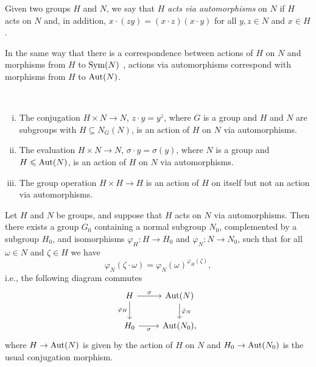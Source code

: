 \begin{defn}
    Given two groups\/ $H$ and\/ $N$, we say that\/ $H$ \textsl{acts via automorphisms} on\/ $N$ if\/ $H$ acts on\/ $N$ and, in addition, $x\cdot(zy) = (x\cdot z)(x\cdot y)$ for all\/ $y,z\in N$ and\/ $x\in H$.
\end{defn}

\begin{rem}\label{actions-and-automorphisms}
    In the same way that there is a correspondence between actions of\/ $H$ on\/ $N$ and morphisms from\/ $H$ to\/ ${\rm Sym}(N)$ {}, actions via automorphisms correspond with morphisms from\/ $H$ to\/ ${\rm Aut}(N)$. 
\end{rem}

\begin{xmpls}\label{examples-action-via-automorphisms}${}$
    \begin{enumerate}[i),font=\upshape]
        \item The conjugation\/ $H\times N\to N$, $z\cdot y=y^z$, where\/ $G$ is a group and\/ $H$ and\/ $N$ are subgroups with\/ $H\subseteq N_G(N)$, is an action of\/ $H$ on\/ $N$ via automorphisms.

        \item The evaluation\/ $H\times N\to N$, $\sigma\cdot y=\sigma(y)$, where\/ $N$ is a group and\/ $H\leqslant{\rm Aut}(N)$, is an action of\/ $H$ on\/ $N$ via automorphisms.

        \item The group operation $H\times H\to H$ is an action of\/ $H$ on itself but not an action via automorphisms.
    \end{enumerate}
\end{xmpls}

\begin{thm}\label{semidirect-product-thm}
    Let\/ $H$ and\/ $N$ be groups, and suppose that\/ $H$ acts on\/ $N$ via automorphisms. Then there exists a group\/ $G_0$ containing a normal subgroup\/ $N_0$, complemented by a subgroup\/ $H_0$, and isomorphisms $\varphi_H\colon H\to H_0$ and $\varphi_N\colon N\to N_0$, such that for all\/ $\omega \in N$ and\/ $\zeta \in H$ we have
    \begin{equation}\label{eq7}
        \varphi_N(\zeta\cdot\omega) = \varphi_N(\omega)^{\varphi_H(\zeta)},
    \end{equation}
    i.e., the following diagram commutes
    $$
        \begin{tikzcd}
            H \arrow[r, "\sigma"] \arrow[d, "\varphi_H"']
                & \Aut(N) \arrow[d, "\hat{\varphi}_N"] \\
            H_0 \arrow[r, "\sigma"']
                & \Aut(N_0),
        \end{tikzcd}
    $$
    where\/ $H\to{\rm Aut}(N)$ is given by the action of\/ $H$ on\/ $N$ and\/ $H_0\to{\rm Aut}(N_0)$ is the usual conjugation morphism.
\end{thm}


